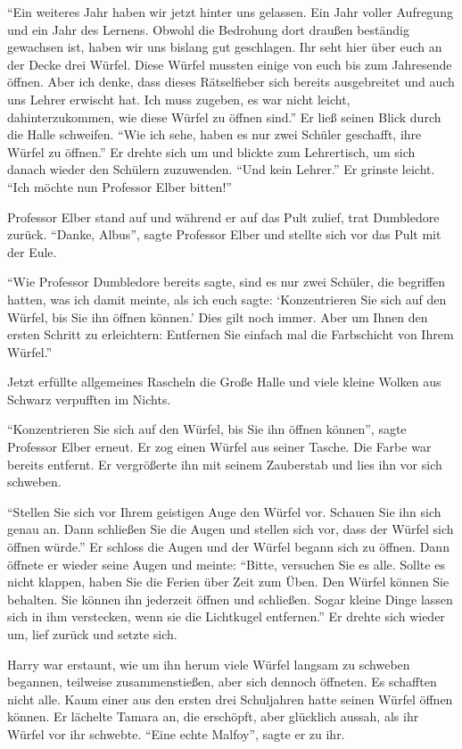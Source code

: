 \enquote{Ein weiteres Jahr haben wir jetzt hinter uns gelassen. Ein Jahr voller Aufregung und ein Jahr des Lernens. Obwohl die Bedrohung dort draußen beständig gewachsen ist, haben wir uns bislang gut geschlagen. Ihr seht hier über euch an der Decke drei Würfel. Diese Würfel mussten einige von euch bis zum Jahresende öffnen. Aber ich denke, dass dieses Rätselfieber sich bereits ausgebreitet und auch uns Lehrer erwischt hat. Ich muss zugeben, es war nicht leicht, dahinterzukommen, wie diese Würfel zu öffnen sind.} Er ließ seinen Blick durch die Halle schweifen. \enquote{Wie ich sehe, haben es nur zwei Schüler geschafft, ihre Würfel zu öffnen.} Er drehte sich um und blickte zum Lehrertisch, um sich danach wieder den Schülern zuzuwenden. \enquote{Und kein Lehrer.} Er grinste leicht. \enquote{Ich möchte nun Professor Elber bitten!}

Professor Elber stand auf und während er auf das Pult zulief, trat Dumbledore zurück. \enquote{Danke, Albus}, sagte Professor Elber und stellte sich vor das Pult mit der Eule.

\enquote{Wie Professor Dumbledore bereits sagte, sind es nur zwei Schüler, die begriffen hatten, was ich damit meinte, als ich euch sagte: \enquote{Konzentrieren Sie sich auf den Würfel, bis Sie ihn öffnen können.} Dies gilt noch immer. Aber um Ihnen den ersten Schritt zu erleichtern: Entfernen Sie einfach mal die Farbschicht von Ihrem Würfel.}

Jetzt erfüllte allgemeines Rascheln die Große Halle und viele kleine Wolken aus Schwarz verpufften im Nichts.

\enquote{Konzentrieren Sie sich auf den Würfel, bis Sie ihn öffnen können}, sagte Professor Elber erneut. Er zog einen Würfel aus seiner Tasche. Die Farbe war bereits entfernt. Er vergrößerte ihn mit seinem Zauberstab und lies ihn vor sich schweben.

\enquote{Stellen Sie sich vor Ihrem geistigen Auge den Würfel vor. Schauen Sie ihn sich genau an. Dann schließen Sie die Augen und stellen sich vor, dass der Würfel sich öffnen würde.} Er schloss die Augen und der Würfel begann sich zu öffnen. Dann öffnete er wieder seine Augen und meinte: \enquote{Bitte, versuchen Sie es alle. Sollte es nicht klappen, haben Sie die Ferien über Zeit zum Üben. Den Würfel können Sie behalten. Sie können ihn jederzeit öffnen und schließen. Sogar kleine Dinge lassen sich in ihm verstecken, wenn sie die Lichtkugel entfernen.} Er drehte sich wieder um, lief zurück und setzte sich.

Harry war erstaunt, wie um ihn herum viele Würfel langsam zu schweben begannen, teilweise zusammenstießen, aber sich dennoch öffneten. Es schafften nicht alle. Kaum einer aus den ersten drei Schuljahren hatte seinen Würfel öffnen können. Er lächelte Tamara an, die erschöpft, aber glücklich aussah, als ihr Würfel vor ihr schwebte. \enquote{Eine echte Malfoy}, sagte er zu ihr.

